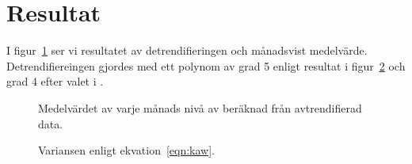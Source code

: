 \section{Resultat}
\label{sec:resultat}

I figur~\ref{fig:n2o} ser vi resultatet av detrendifieringen och månadsvist medelvärde. Detrendifiereingen gjordes med ett polynom av grad 5 enligt resultat i figur~\ref{fig:deg} och grad 4 efter valet i \cite{ref:liao}.

\begin{figure}[H]
    \centering
    
    \caption{Medelvärdet av varje månads nivå av  beräknad från avtrendifierad data.}
    \label{fig:n2o}
\end{figure}

\begin{figure}[H]
    \centering
    
    \caption{Variansen enligt ekvation~\ref{eqn:kaw}.}
    \label{fig:deg}
\end{figure}



